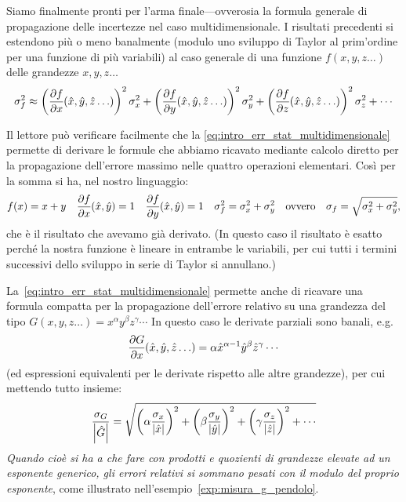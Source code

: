 Siamo finalmente pronti per l'arma finale---ovverosia la formula generale di
propagazione delle incertezze nel caso multidimensionale.
I risultati precedenti si estendono più o meno banalmente (modulo uno
sviluppo di Taylor al prim'ordine per una funzione di più variabili) al caso
generale di una funzione $f(x, y, z\ldots)$ delle grandezze $x, y, z\ldots$
\begin{align}\label{eq:intro_err_stat_multidimensionale}
  \sigma^2_f \approx
  \left(\pd{f}{x}{\hat{x}, \hat{y}, \hat{z}\ldots}\right)^2 \sigma^2_x +
  \left(\pd{f}{y}{\hat{x}, \hat{y}, \hat{z}\ldots}\right)^2 \sigma^2_y +
  \left(\pd{f}{z}{\hat{x}, \hat{y}, \hat{z}\ldots}\right)^2 \sigma^2_z + \cdots
\end{align}

Il lettore può verificare facilmente che la
\eqref{eq:intro_err_stat_multidimensionale} permette di derivare le
formule che abbiamo ricavato mediante calcolo diretto per la propagazione
dell'errore massimo nelle quattro operazioni elementari.
Così per la somma si ha, nel nostro linguaggio:
\begin{align*}
  f(x) = x + y
  \quad
  \pd{f}{x}{\hat{x}, \hat{y}} = 1
  \quad
  \pd{f}{y}{\hat{x}, \hat{y}} = 1
  \quad
  \sigma^2_f = \sigma_x^2 + \sigma_y^2
  \quad \text{ovvero} \quad
  \sigma_f = \sqrt{\sigma_x^2 + \sigma_y^2},
\end{align*}
che è il risultato che avevamo già derivato. (In questo caso il risultato
è esatto perché la nostra funzione è lineare in entrambe le variabili, per
cui tutti i termini successivi dello sviluppo in serie di Taylor si annullano.)

La~\eqref{eq:intro_err_stat_multidimensionale} permette anche di ricavare una
formula compatta per la propagazione dell'errore relativo
su una grandezza del tipo $G(x, y, z\ldots) = x^\alpha y^\beta z^\gamma \cdots$
In questo caso le derivate parziali sono banali, e.g.
\begin{align*}
  \pd{G}{x}{\hat{x}, \hat{y}, \hat{z}\ldots} =
  \alpha \hat{x}^{\alpha - 1} \hat{y}^\beta \hat{z}^\gamma \cdots
\end{align*}
(ed espressioni equivalenti per le derivate rispetto alle altre grandezze), per
cui mettendo tutto insieme:
\begin{align}\label{eq:errore_relativo_generale}
  \frac{\sigma_G}{\left| \hat{G} \right|} = \sqrt{
  \left(\alpha\frac{\sigma_x}{\left| \hat{x} \right|}\right)^2 +
  \left(\beta\frac{\sigma_y}{\left| \hat{y} \right|}\right)^2 +
  \left(\gamma\frac{\sigma_z}{\left| \hat{z} \right|}\right)^2 + \cdots
  }
\end{align}
\emph{Quando cioè si ha a che fare con prodotti e quozienti di grandezze
  elevate ad un esponente generico, gli errori relativi si sommano pesati con
  il modulo del proprio esponente}, come illustrato
nell'esempio~\ref{exp:misura_g_pendolo}.

